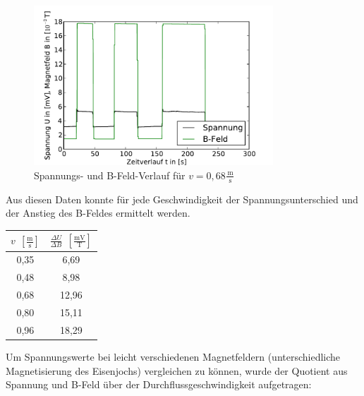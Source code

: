 \documentclass[11pt]{scrartcl}
\newcommand{\unit}[1]{\ensuremath{\,\mathrm{#1}}} %
\begin{document}

\begin{figure}[H]
\begin{center}
\includegraphics[width=0.8\textwidth]{images/U-B-068.pdf}
\end{center}
\vspace{-1.5\baselineskip}
\caption{Spannungs- und B-Feld-Verlauf für $v=0,68\frac{\unit{m}}{\unit{s}}$}
\label{U-B-068}
\end{figure}

Aus diesen Daten konnte für jede Geschwindigkeit der Spannungsunterschied und der Anstieg des B-Feldes ermittelt werden. 

\begin{table}[ht]
\label{Geschwindigkeitstabelle}
\begin{center}\vspace{-\baselineskip}
\begin{tabular}{c|c}
$v\; \unit{[\frac{m}{s}]}$ &
$\frac{\Delta U}{\Delta B}\; \unit{[\frac{mV}{T}]}$ \\
\hline
0,35	& 6,69 \\
0,48	& 8,98 \\
0,68	& 12,96 \\
0,80	& 15,11 \\
0,96	& 18,29
\end{tabular}
\vspace{-\baselineskip}\end{center}
\end{table}

Um Spannungswerte bei leicht verschiedenen Magnetfeldern (unterschiedliche Magnetisierung des Eisenjochs) vergleichen zu können, wurde der Quotient aus Spannung und B-Feld über der Durchflussgeschwindigkeit aufgetragen:
\end{document}
